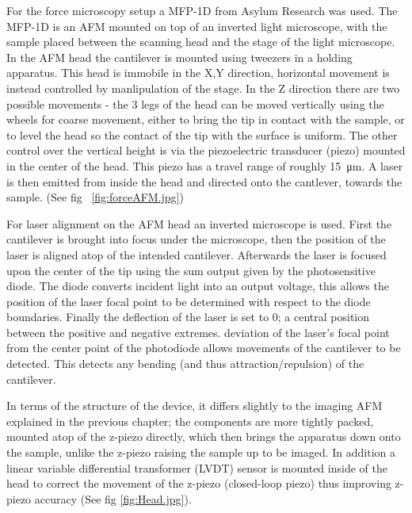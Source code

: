 For the force microscopy setup a MFP-1D from Asylum Research was used. The MFP-1D is an AFM mounted on top of an inverted light microscope, with the sample placed between the scanning head and the stage of the light microscope. In the AFM head the cantilever is mounted using tweezers in a holding apparatus. This head is immobile in the X,Y direction, horizontal movement is instead controlled by manlipulation of the stage. In the Z direction there are two possible movements - the 3 legs of the head can be moved vertically using the wheels for coarse movement, either to bring the tip in contact with the sample, or to level the head so the contact of the tip with the surface is uniform. The other control over the vertical height is via the piezoelectric transducer (piezo) mounted in the center of the head. This piezo has a travel range of roughly \SI{15}{\micro\metre}. A laser is then emitted from inside the head and directed onto the cantlever, towards the sample. (See fig ~\ref{fig:forceAFM.jpg})

For laser alignment on the AFM head an inverted microscope is used. First the cantilever is brought into focus under the microscope, then the position of the laser is aligned atop of the intended cantilever. Afterwards the laser is focused upon the center of the tip using the sum output given by the photosensitive diode. The diode converts incident light into an output voltage, this allows the position of the laser focal point to be determined with respect to the diode boundaries.  Finally the deflection of the laser is set to 0; a central position between the positive and negative extremes. deviation of the laser's focal point from the center point of the photodiode allows movements of the cantilever to be detected. This detects any bending (and thus attraction/repulsion) of the cantilever. 

In terms of the structure of the device, it differs slightly to the imaging AFM explained in the previous chapter; the components are more tightly packed, mounted atop of the z-piezo directly, which then brings the apparatus down onto the sample, unlike the z-piezo raising the sample up to be imaged. In addition a linear variable differential transformer (LVDT) sensor is mounted inside of the head to correct the movement of the z-piezo (closed-loop piezo) thus improving z-piezo accuracy (See fig \ref{fig:Head.jpg}).

